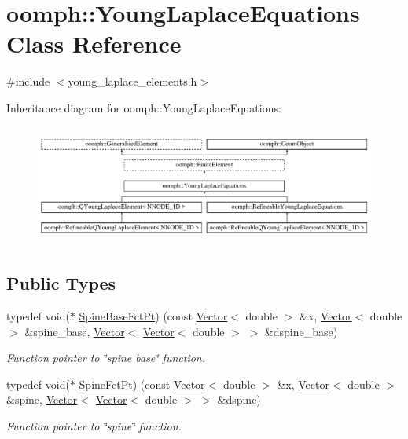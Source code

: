\hypertarget{classoomph_1_1YoungLaplaceEquations}{}\section{oomph\+:\+:Young\+Laplace\+Equations Class Reference}
\label{classoomph_1_1YoungLaplaceEquations}


{\ttfamily \#include $<$young\+\_\+laplace\+\_\+elements.\+h$>$}

Inheritance diagram for oomph\+:\+:Young\+Laplace\+Equations\+:\begin{figure}[H]
\begin{center}
\leavevmode
\includegraphics[height=3.988604cm]{classoomph_1_1YoungLaplaceEquations}
\end{center}
\end{figure}
\subsection*{Public Types}
\begin{DoxyCompactItemize}
\item 
typedef void($\ast$ \hyperlink{classoomph_1_1YoungLaplaceEquations_a5e09288f5d3b710f23e8e57401a48ccc}{Spine\+Base\+Fct\+Pt}) (const \hyperlink{classoomph_1_1Vector}{Vector}$<$ double $>$ \&x, \hyperlink{classoomph_1_1Vector}{Vector}$<$ double $>$ \&spine\+\_\+base, \hyperlink{classoomph_1_1Vector}{Vector}$<$ \hyperlink{classoomph_1_1Vector}{Vector}$<$ double $>$ $>$ \&dspine\+\_\+base)
\begin{DoxyCompactList}\small\item\em Function pointer to \char`\"{}spine base\char`\"{} function. \end{DoxyCompactList}\item 
typedef void($\ast$ \hyperlink{classoomph_1_1YoungLaplaceEquations_a97448cfb2f6361e986d363d9e4463f9f}{Spine\+Fct\+Pt}) (const \hyperlink{classoomph_1_1Vector}{Vector}$<$ double $>$ \&x, \hyperlink{classoomph_1_1Vector}{Vector}$<$ double $>$ \&spine, \hyperlink{classoomph_1_1Vector}{Vector}$<$ \hyperlink{classoomph_1_1Vector}{Vector}$<$ double $>$ $>$ \&dspine)
\begin{DoxyCompactList}\small\item\em Function pointer to \char`\"{}spine\char`\"{} function. \end{DoxyCompactList}\end{DoxyCompactItemize}
